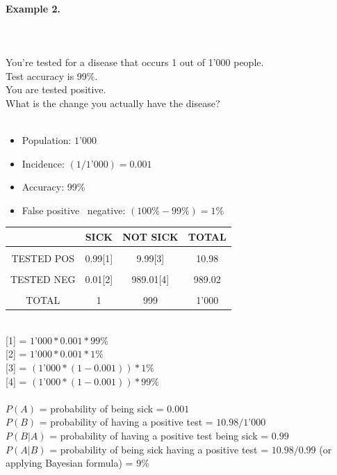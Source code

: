 \documentclass{article}
\begin{document}
\paragraph{Example 2.}\mbox{} \\
\mbox{} \\
You’re tested for a disease that occurs 1 out of 1’000 people. \\ 
Test accuracy is 99\%. \\ 
You are tested positive. \\ 
What is the change you actually have the disease? \\ 
\mbox{} \\
\begin{itemize}
    \item Population: $\text{1'000}$
    \item Incidence: $(1/\text{1’000}) = \text{0.001}$
    \item Accuracy: 99\%
    \item False positive \ negative: $(100\% - 99\%) = 1\%$
\end{itemize}

\begin{center}
\begin{tabular}{|c|c|c|c|}
\hline
 & SICK & NOT SICK & TOTAL \\ \hline
&&&\\[-1em]
TESTED POS & 0.99[1] & 9.99[3] & 10.98 \\ \hline
&&&\\[-1em]
TESTED NEG & 0.01[2] & 989.01[4] & 989.02 \\ \hline
&&&\\[-1em]
TOTAL & 1 & 999 & 1'000 \\ 
\hline
\end{tabular}
\end{center}

\mbox{} \\  

{[1]} = $\text{1’000} * 0.001 * 99\%$ \\ 
{[2]} = $\text{1’000} * 0.001 * 1\%$ \\ 
{[3]} = $(\text{1’000} * (1 - 0.001)) * 1\%$ \\ 
{[4]} = $(\text{1’000} * (1 - 0.001)) * 99\%$ \\

\mbox{} \\

$P(A)$ = probability of being sick = $0.001$ \\ 
$P(B)$ = probability of having a positive test = $10.98 / \text{1’000}$ \\ 
$P(B|A)$ = probability of having a positive test being sick = $0.99$ \\ 
$P(A|B)$ = probability of being sick having a positive test = $10.98 / 0.99$ (or applying Bayesian formula) = $9\%$ \\ 
\end{document}
